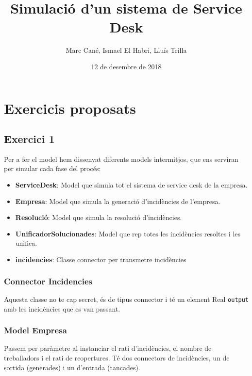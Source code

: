 \documentclass[11pt,a4paper,twoside]{report}
\begin{document}
\title{Simulació d'un sistema de Service Desk}
\author{Marc Cané, Ismael El Habri, Lluís Trilla}
\date{12 de desembre de 2018}
\maketitle

\tableofcontents

\chapter{Exercicis proposats}

\section{Exercici 1}

Per a fer el model hem dissenyat diferents models intermitjos, que ens serviran per simular cada fase del procés:
\begin{itemize}
  \item \textbf{ServiceDesk}: Model que simula tot el sistema de service desk de la empresa.
  \item \textbf{Empresa}: Model que simula la generació d'incidències de l'empresa.
  \item \textbf{Resolució}: Model que simula la resolució d'incidències.
  \item \textbf{UnificadorSolucionades}: Model que rep totes les incidències resoltes i les unifica.
  \item \textbf{incidencies}: Classe connector per transmetre incidències 
\end{itemize}

\subsection{Connector Incidencies}



Aquesta classe no te cap secret, és de tipus connector i té un element Real \texttt{output} amb les incidències que es van passant.

\subsection{Model Empresa}


Passem per paràmetre al instanciar el rati d'incidències, el nombre de treballadors i el rati de reopertures. Té dos connectors de incidències, un de sortida (generades) i un d'entrada (tancades).
\end{document}
